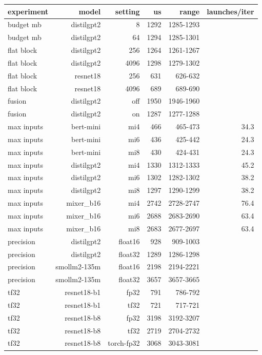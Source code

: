 \begin{tabular}{lrrrrr}
\toprule
experiment & model & setting & us & range & launches/iter \\
\midrule
budget mb & distilgpt2 & 8 & 1292 & 1285-1293 &  \\
budget mb & distilgpt2 & 64 & 1294 & 1285-1301 &  \\
flat block & distilgpt2 & 256 & 1264 & 1261-1267 &  \\
flat block & distilgpt2 & 4096 & 1298 & 1279-1302 &  \\
flat block & resnet18 & 256 & 631 & 626-632 &  \\
flat block & resnet18 & 4096 & 689 & 689-690 &  \\
fusion & distilgpt2 & off & 1950 & 1946-1960 &  \\
fusion & distilgpt2 & on & 1287 & 1277-1288 &  \\
max inputs & bert-mini & mi4 & 466 & 465-473 & 34.3 \\
max inputs & bert-mini & mi6 & 436 & 425-442 & 24.3 \\
max inputs & bert-mini & mi8 & 430 & 424-431 & 24.3 \\
max inputs & distilgpt2 & mi4 & 1330 & 1312-1333 & 45.2 \\
max inputs & distilgpt2 & mi6 & 1302 & 1282-1302 & 38.2 \\
max inputs & distilgpt2 & mi8 & 1297 & 1290-1299 & 38.2 \\
max inputs & mixer\_b16 & mi4 & 2742 & 2728-2747 & 76.4 \\
max inputs & mixer\_b16 & mi6 & 2688 & 2683-2690 & 63.4 \\
max inputs & mixer\_b16 & mi8 & 2683 & 2677-2697 & 63.4 \\
precision & distilgpt2 & float16 & 928 & 909-1003 &  \\
precision & distilgpt2 & float32 & 1289 & 1286-1298 &  \\
precision & smollm2-135m & float16 & 2198 & 2194-2221 &  \\
precision & smollm2-135m & float32 & 3657 & 3657-3665 &  \\
tf32 & resnet18-b1 & fp32 & 791 & 786-792 &  \\
tf32 & resnet18-b1 & tf32 & 721 & 717-721 &  \\
tf32 & resnet18-b8 & fp32 & 3198 & 3192-3207 &  \\
tf32 & resnet18-b8 & tf32 & 2719 & 2704-2732 &  \\
tf32 & resnet18-b8 & torch-fp32 & 3068 & 3043-3081 &  \\
\bottomrule
\end{tabular}
